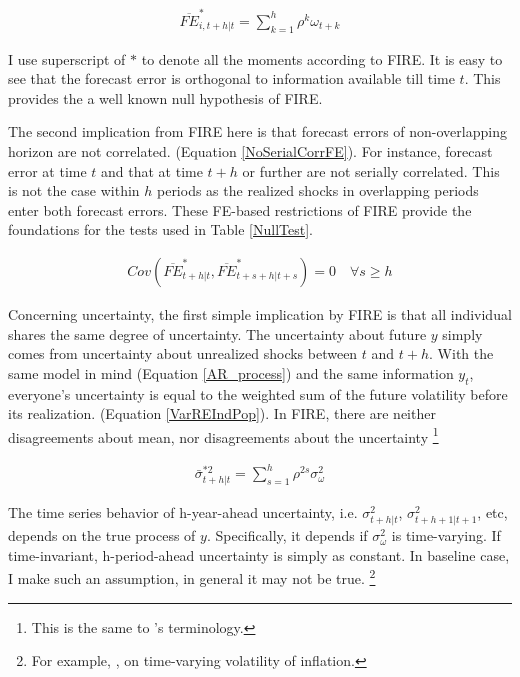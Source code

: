 \documentclass[12pt]{article}
\begin{document}
	\begin{eqnarray}\label{NoPastInfFE}
		\overline{FE}^{*}_{i,t+h|t} = \sum^{h}_{k=1} \rho^k \omega_{t+k}
	\end{eqnarray}
	
	I use superscript of $*$ to denote all the moments according to FIRE. It is easy to see that the forecast error is orthogonal to information available till time $t$. This provides the a well known null hypothesis of FIRE.
	
	The second implication from FIRE here is that forecast errors of non-overlapping horizon are not correlated. (Equation \ref{NoSerialCorrFE}). For instance, forecast error at time $t$ and that at time $t+h$ or further are not serially correlated. This is not the case within $h$ periods as the realized shocks in overlapping periods enter both forecast errors.  These FE-based restrictions of FIRE provide the foundations for the tests used in Table \ref{NullTest}. 
	
	\begin{eqnarray}\label{NoSerialCorrFE}
		Cov(\overline{FE}^{*}_{t+h|t}, \overline{FE}^{*}_{t+s+h|t+s}) = 0 \quad \forall s \geq h
	\end{eqnarray}
	
	Concerning uncertainty, the first simple implication by FIRE is that all individual shares the same degree of uncertainty. The uncertainty about future $y$ simply comes from uncertainty about unrealized shocks between $t$ and $t+h$. With the same model in mind (Equation \ref{AR_process}) and the same information $y_t$, everyone's uncertainty is equal to the weighted sum of the future volatility before its realization. (Equation \ref{VarREIndPop}). In FIRE, there are neither disagreements about mean, nor disagreements about the uncertainty \footnote{This is the same to \citet{jurado2015measuring}'s terminology.} 
	
	\begin{eqnarray}\label{VarREIndPop}
		\bar \sigma^{*2}_{t+h|t} = \sum^{h}_{s=1}\rho^{2s} \sigma^2_{\omega}
	\end{eqnarray}
	
	The time series behavior of h-year-ahead uncertainty, i.e. $\sigma^2_{t+h|t}$, $\sigma^2_{t+h+1|t+1}$, etc, depends on the true process of $y$. Specifically, it depends if $\sigma^2_\omega$ is time-varying. If time-invariant, h-period-ahead uncertainty is simply as constant. In baseline case, I make such an assumption, in general it may not be true. \footnote{For example, \citet{justiniano2008time}, \citet{vavra2013inflation} on time-varying volatility of inflation.} 
	
\end{document}
